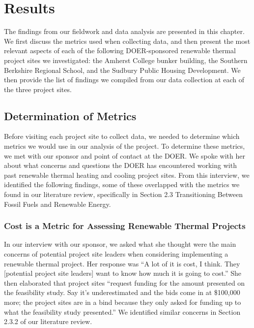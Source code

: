 
\chapter{Results}
\par The findings from our fieldwork and data analysis are presented in this chapter. We first discuss the metrics used when collecting data, and then present the most relevant aspects of each of the following DOER-sponsored renewable thermal project sites we investigated: the Amherst College bunker building, the Southern Berkshire Regional School, and the Sudbury Public Housing Development. We then provide the list of findings we compiled from our data collection at each of the three project sites.

\section{Determination of Metrics}
\par Before visiting each project site to collect data, we needed to determine which metrics we would use in our analysis of the project. To determine these metrics, we met with our sponsor and point of contact at the DOER. We spoke with her about what concerns and questions the DOER has encountered working with past renewable thermal heating and cooling project sites. From this interview, we identified the following findings, some of these overlapped with the metrics we found in our literature review, specifically in Section 2.3 Transitioning Between Fossil Fuels and Renewable Energy.

\subsection{Cost is a Metric for Assessing Renewable Thermal Projects}
\par In our interview with our sponsor, we asked what she thought were the main concerns of potential project site leaders when considering implementing a renewable thermal project. Her response was “A lot of it is cost, I think. They [potential project site leaders] want to know how much it is going to cost.” She then elaborated that project sites “request funding for the amount presented on the feasibility study. Say it’s underestimated and the bids come in at \$100,000 more; the project sites are in a bind because they only asked for funding up to what the feasibility study presented.” We identified similar concerns in Section 2.3.2 of our literature review.

